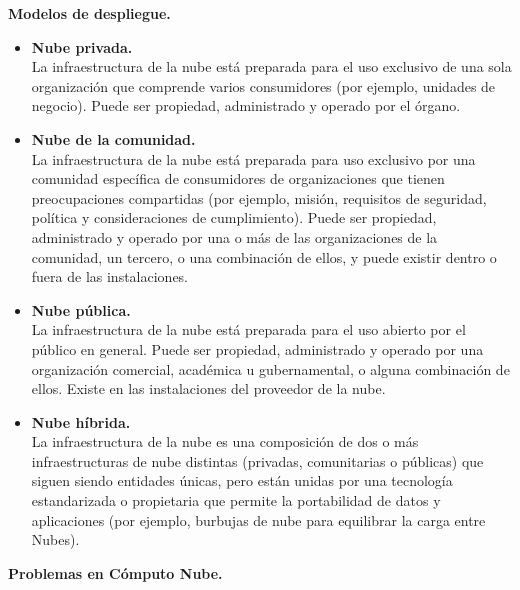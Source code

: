  \textbf{Modelos de despliegue. }
\begin{itemize}
	\item \textbf {Nube privada. } \\ La infraestructura de la nube está preparada para el uso exclusivo de una sola organización que comprende varios consumidores (por ejemplo, unidades de negocio). Puede ser propiedad, administrado y operado por el órgano.
	\item \textbf{Nube de la comunidad. } \\ La infraestructura de la nube está preparada para uso exclusivo por una comunidad específica de consumidores de organizaciones que tienen preocupaciones compartidas (por ejemplo, misión, requisitos de seguridad, política y consideraciones de cumplimiento). Puede ser propiedad, administrado y operado por una o más de las organizaciones de la comunidad, un tercero, o una combinación de ellos, y puede existir dentro o fuera de las instalaciones.
	\item \textbf{Nube pública. } \\ La infraestructura de la nube está preparada para el uso abierto por el público en general. Puede ser propiedad, administrado y operado por una organización comercial, académica u gubernamental, o alguna combinación de ellos. Existe en las instalaciones del proveedor de la nube.
	\item \textbf{Nube híbrida. } \\  La infraestructura de la nube es una composición de dos o más infraestructuras de nube distintas (privadas, comunitarias o públicas) que siguen siendo entidades únicas, pero están unidas por una tecnología estandarizada o propietaria que permite la portabilidad de datos y aplicaciones (por ejemplo, burbujas de nube para equilibrar la carga entre Nubes).
\end{itemize}   




 \textbf{Problemas en Cómputo Nube. }

